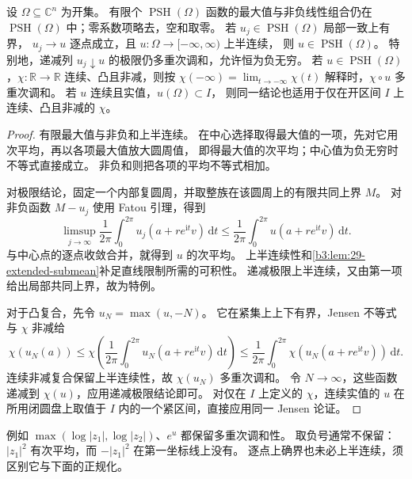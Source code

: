 \begin{proposition}[基本运算与极限]\label{b3:prop:29-psh-operations}
设 \(\Omega\subseteq\mathbb C^n\) 为开集。
有限个 \(\operatorname{PSH}(\Omega)\) 函数的最大值与非负线性组合仍在
\(\operatorname{PSH}(\Omega)\) 中；零系数项略去，空和取零。
若 \(u_j\in\operatorname{PSH}(\Omega)\) 局部一致上有界，
\(u_j\to u\) 逐点成立，且 \(u:\Omega\to[-\infty,\infty)\) 上半连续，
则 \(u\in\operatorname{PSH}(\Omega)\)。
特别地，递减列 \(u_j\downarrow u\) 的极限仍多重次调和，允许恒为负无穷。
\ProseParagraphBreak
若 \(u\in\operatorname{PSH}(\Omega)\)，\(\chi:\mathbb R\to\mathbb R\)
连续、凸且非减，则按
\(\chi(-\infty)=\lim_{t\to-\infty}\chi(t)\) 解释时，\(\chi\circ u\) 多重次调和。
若 \(u\) 连续且实值，\(u(\Omega)\subset I\)，
则同一结论也适用于仅在开区间 \(I\) 上连续、凸且非减的 \(\chi\)。
\end{proposition}
\begin{proof}
有限最大值与非负和上半连续。
在中心选择取得最大值的一项，先对它用次平均，再以各项最大值放大圆周值，
即得最大值的次平均；中心值为负无穷时不等式直接成立。
非负和则把各项的平均不等式相加。

对极限结论，固定一个内部复圆周，并取整族在该圆周上的有限共同上界 \(M\)。
对非负函数 \(M-u_j\) 使用 Fatou 引理，得到
\[
 \limsup_{j\to\infty}\frac1{2\pi}\int_0^{2\pi}
 u_j(a+re^{\mathrm it}v)\,\mathrm dt
 \le\frac1{2\pi}\int_0^{2\pi}u(a+re^{\mathrm it}v)\,\mathrm dt.
\]
与中心点的逐点收敛合并，就得到 \(u\) 的次平均。
上半连续性和\cref{b3:lem:29-extended-submean}补足直线限制所需的可积性。
递减极限上半连续，又由第一项给出局部共同上界，故为特例。

对于凸复合，先令 \(u_N=\max(u,-N)\)。
它在紧集上上下有界，Jensen 不等式与 \(\chi\) 非减给
\[
 \chi(u_N(a))
 \le\chi\left(\frac1{2\pi}\int_0^{2\pi}u_N(a+re^{\mathrm it}v)\,\mathrm dt\right)
 \le\frac1{2\pi}\int_0^{2\pi}\chi(u_N(a+re^{\mathrm it}v))\,\mathrm dt.
\]
连续非减复合保留上半连续性，故 \(\chi(u_N)\) 多重次调和。
令 \(N\to\infty\)，这些函数递减到 \(\chi(u)\)，应用递减极限结论即可。
对仅在 \(I\) 上定义的 \(\chi\)，连续实值的 \(u\)
在所用闭圆盘上取值于 \(I\) 内的一个紧区间，直接应用同一 Jensen 论证。
\end{proof}

例如 \(\max(\log|z_1|,\log|z_2|)\)、\(e^u\) 都保留多重次调和性。
取负号通常不保留：\(|z_1|^2\) 有次平均，而 \(-|z_1|^2\) 在第一坐标线上没有。
逐点上确界也未必上半连续，须区别它与下面的正规化。


